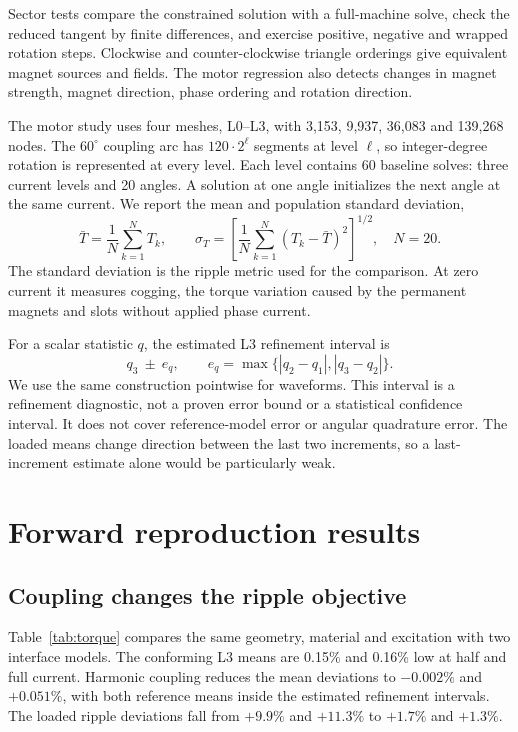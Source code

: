 \documentclass{anvil-paper}
\begin{document}
Sector tests compare the constrained solution with a full-machine solve,
check the reduced tangent by finite differences, and exercise positive,
negative and wrapped rotation steps. Clockwise and counter-clockwise
triangle orderings give equivalent magnet sources and fields. The motor
regression also detects changes in magnet strength, magnet direction,
phase ordering and rotation direction.

The motor study uses four meshes, L0--L3, with 3,153, 9,937, 36,083 and
139,268 nodes. The $60^\circ$ coupling arc has $120\cdot2^\ell$ segments at level
$\ell$, so integer-degree rotation is represented at every level.
Each level contains 60 baseline solves: three current levels and 20
angles. A solution at one angle initializes the next angle at the same
current. We report the mean and population standard deviation,
\begin{equation}
 \bar T=\frac1N\sum_{k=1}^N T_k,\qquad
 \sigma_T=\left[\frac1N\sum_{k=1}^N(T_k-\bar T)^2\right]^{1/2},
 \quad N=20.
\end{equation}
The standard deviation is the ripple metric used for the comparison.
At zero current it measures cogging, the torque variation caused by the
permanent magnets and slots without applied phase current.

For a scalar statistic $q$, the estimated L3 refinement interval is
\begin{equation}
 q_3\ \pm\ e_q,\qquad
 e_q=\max\{|q_2-q_1|,|q_3-q_2|\}.
 \label{eq:band}
\end{equation}
We use the same construction pointwise for waveforms. This interval is a
refinement diagnostic, not a proven error bound or a statistical confidence
interval. It does not cover reference-model error or angular quadrature
error. The loaded means change direction between the last two increments,
so a last-increment estimate alone would be particularly weak.

\section{Forward reproduction results}
\subsection{Coupling changes the ripple objective}
Table~\ref{tab:torque} compares the same geometry, material and excitation
with two interface models. The conforming L3 means are 0.15\% and 0.16\%
low at half and full current. Harmonic coupling reduces the mean deviations
to $-0.002\%$ and $+0.051\%$, with both reference means inside the estimated
refinement intervals. The loaded ripple deviations fall from $+9.9\%$
and $+11.3\%$ to $+1.7\%$ and $+1.3\%$.
\end{document}
